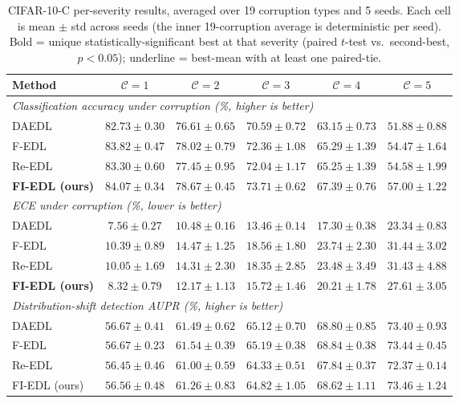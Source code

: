 \documentclass[review,5p,times]{elsarticle}
\begin{document}
\begin{table}[t]
  \centering
  \caption{CIFAR-10-C per-severity results, averaged over 19
    corruption types and 5 seeds.  Each cell is mean $\pm$ std across
    seeds (the inner 19-corruption average is deterministic per
    seed). Bold = unique statistically-significant best at that
    severity (paired $t$-test vs.\ second-best, $p\!<\!0.05$);
    underline = best-mean with at least one paired-tie.}
  \label{tab:main-cifar10c}
  \small
  \begin{tabular}{lccccc}
    \toprule
    Method & $\mathcal{C}\!=\!1$ & $\mathcal{C}\!=\!2$ & $\mathcal{C}\!=\!3$ & $\mathcal{C}\!=\!4$ & $\mathcal{C}\!=\!5$ \\
    \midrule
    \multicolumn{6}{l}{\emph{Classification accuracy under corruption (\%, higher is better)}} \\
    DAEDL  & $82.73 \pm 0.30$ & $76.61 \pm 0.65$ & $70.59 \pm 0.72$ & $63.15 \pm 0.73$ & $51.88 \pm 0.88$ \\
    F-EDL  & $83.82 \pm 0.47$ & $78.02 \pm 0.79$ & $72.36 \pm 1.08$ & $65.29 \pm 1.39$ & $54.47 \pm 1.64$ \\
    Re-EDL & $83.30 \pm 0.60$ & $77.45 \pm 0.95$ & $72.04 \pm 1.17$ & $65.25 \pm 1.39$ & $54.58 \pm 1.99$ \\
    \textbf{FI-EDL (ours)} & $\mathbf{84.07 \pm 0.34}$ & $\mathbf{78.67 \pm 0.45}$ & $\mathbf{73.71 \pm 0.62}$ & $\mathbf{67.39 \pm 0.76}$ & \underline{$57.00 \pm 1.22$} \\
    \midrule
    \multicolumn{6}{l}{\emph{ECE under corruption (\%, lower is better)}} \\
    DAEDL  & $\mathbf{7.56 \pm 0.27}$ & $\mathbf{10.48 \pm 0.16}$ & $\mathbf{13.46 \pm 0.14}$ & $\mathbf{17.30 \pm 0.38}$ & $\mathbf{23.34 \pm 0.83}$ \\
    F-EDL  & $10.39 \pm 0.89$ & $14.47 \pm 1.25$ & $18.56 \pm 1.80$ & $23.74 \pm 2.30$ & $31.44 \pm 3.02$ \\
    Re-EDL & $10.05 \pm 1.69$ & $14.31 \pm 2.30$ & $18.35 \pm 2.85$ & $23.48 \pm 3.49$ & $31.43 \pm 4.88$ \\
    \textbf{FI-EDL (ours)} & $8.32 \pm 0.79$ & $12.17 \pm 1.13$ & $15.72 \pm 1.46$ & $20.21 \pm 1.78$ & $27.61 \pm 3.05$ \\
    \midrule
    \multicolumn{6}{l}{\emph{Distribution-shift detection AUPR (\%, higher is better)}} \\
    DAEDL  & $56.67 \pm 0.41$ & $61.49 \pm 0.62$ & $65.12 \pm 0.70$ & $68.80 \pm 0.85$ & $73.40 \pm 0.93$ \\
    F-EDL  & $56.67 \pm 0.23$ & $61.54 \pm 0.39$ & $65.19 \pm 0.38$ & $68.84 \pm 0.38$ & $73.44 \pm 0.45$ \\
    Re-EDL & $56.45 \pm 0.46$ & $61.00 \pm 0.59$ & $64.33 \pm 0.51$ & $67.84 \pm 0.37$ & $72.37 \pm 0.14$ \\
    FI-EDL (ours) & $56.56 \pm 0.48$ & $61.26 \pm 0.83$ & $64.82 \pm 1.05$ & $68.62 \pm 1.11$ & $73.46 \pm 1.24$ \\
    \bottomrule
  \end{tabular}
\end{table}
\end{document}
